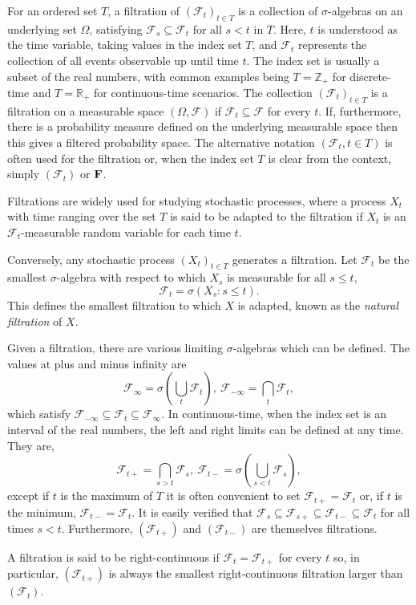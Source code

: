 \documentclass[12pt]{article}
\begin{document}
For an ordered set $T$, a filtration of  $(\mathcal{F}_t)_{t\in T}$ is a collection of $\sigma$-algebras on an underlying set $\Omega$, satisfying $\mathcal{F}_s\subseteq\mathcal{F}_t$ for all $s<t$ in $T$. Here, $t$ is understood as the time variable, taking values in the index set $T$, and $\mathcal{F}_t$ represents the collection of all events observable up until time $t$. The index set is usually a subset of the real numbers, with common examples being $T=\mathbb{Z}_+$ for discrete-time and $T=\mathbb{R}_+$ for continuous-time scenarios.
The collection $(\mathcal{F}_t)_{t\in T}$ is a filtration on a measurable space $(\Omega,\mathcal{F})$ if $\mathcal{F}_t\subseteq\mathcal{F}$ for every $t$. If, furthermore, there is a probability measure defined on the underlying measurable space then this gives a filtered probability space.
The alternative notation $(\mathcal{F}_t,t\in T)$ is often used for the filtration or, when the index set $T$ is clear from the context, simply $(\mathcal{F}_t)$ or ${\bf F}$.

Filtrations are widely used for studying stochastic processes, where a process $X_t$ with time ranging over the set $T$ is said to be adapted to the filtration if $X_t$ is an $\mathcal{F}_t$-measurable random variable for each time $t$.

Conversely, any stochastic process $(X_t)_{t\in T}$ generates a filtration. Let $\mathcal{F}_t$ be the smallest $\sigma$-algebra with respect to which $X_s$ is measurable for all $s\le t$,
\begin{equation*}
\mathcal{F}_t=\sigma\left(X_s:s\le t\right).
\end{equation*}
This defines the smallest filtration to which $X$ is adapted, known as the \emph{natural filtration} of $X$.

Given a filtration, there are various limiting $\sigma$-algebras which can be defined. The values at plus and minus infinity are
\begin{equation*}
\mathcal{F}_\infty = \sigma\left(\bigcup_t\mathcal{F}_t\right),\
\mathcal{F}_{-\infty} = \bigcap_t\mathcal{F}_t,
\end{equation*}
which satisfy $\mathcal{F}_{-\infty}\subseteq\mathcal{F}_t\subseteq\mathcal{F}_\infty$.
In continuous-time, when the index set is an interval of the real numbers, the left and right limits can be defined at any time. They are,
\begin{equation*}
\mathcal{F}_{t+}=\bigcap_{s>t}\mathcal{F}_s,\ \mathcal{F}_{t-}=\sigma\left(\bigcup_{s<t}\mathcal{F}_s\right),
\end{equation*}
except if $t$ is the maximum of $T$ it is often convenient to set $\mathcal{F}_{t+}=\mathcal{F}_t$ or, if $t$ is the minimum, $\mathcal{F}_{t-}=\mathcal{F}_t$. It is easily verified that $\mathcal{F}_s\subseteq\mathcal{F}_{s+}\subseteq\mathcal{F}_{t-}\subseteq\mathcal{F}_t$ for all times $s<t$.
Furthermore, $(\mathcal{F}_{t+})$ and $(\mathcal{F}_{t-})$ are themselves filtrations.

A filtration is said to be right-continuous if $\mathcal{F}_t=\mathcal{F}_{t+}$ for every $t$ so, in particular, $(\mathcal{F}_{t+})$ is always the smallest right-continuous filtration larger than $(\mathcal{F}_t)$.


\end{document}
